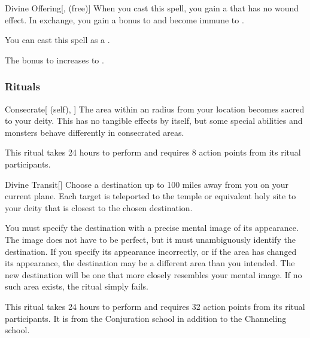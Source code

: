 \lowercase{\hypertarget{spell:Divine Offering}{}}\label{spell:Divine Offering}
\begin{freeability}[Rank 6]{\hypertarget{spell:Divine Offering}{Divine Offering}}[,  (free)]
When you cast this spell, you gain a  that has no wound effect.
In exchange, you gain a  bonus to  and become immune to .

You can cast this spell as a .

\rankline
{} The bonus to  increases to .
\end{freeability}
\vspace{0.25em}



\subsubsection{Rituals}


\lowercase{\hypertarget{spell:Consecrate}{}}\label{spell:Consecrate}
\begin{attuneability}[Rank 3]{\hypertarget{spell:Consecrate}{Consecrate}}[ (self), ]
\targetrule
The area within an \arealarge radius  from your location becomes sacred to your deity.
This has no tangible effects by itself, but some special abilities and monsters behave differently in consecrated areas.

This ritual takes 24 hours to perform and requires 8 action points from its ritual participants.
\end{attuneability}
\vspace{0.25em}



\lowercase{\hypertarget{spell:Divine Transit}{}}\label{spell:Divine Transit}
\begin{apability}[Rank 5]{\hypertarget{spell:Divine Transit}{Divine Transit}}[]
Choose a destination up to 100 miles away from you on your current plane.
Each target is teleported to the temple or equivalent holy site to your deity that is closest to the chosen destination.

You must specify the destination with a precise mental image of its appearance.
The image does not have to be perfect, but it must unambiguously identify the destination.
If you specify its appearance incorrectly, or if the area has changed its appearance, the destination may be a different area than you intended.
The new destination will be one that more closely resembles your mental image.
If no such area exists, the ritual simply fails.

This ritual takes 24 hours to perform and requires 32 action points from its ritual participants.
It is from the Conjuration school in addition to the Channeling school.
\end{apability}
\vspace{0.25em}



